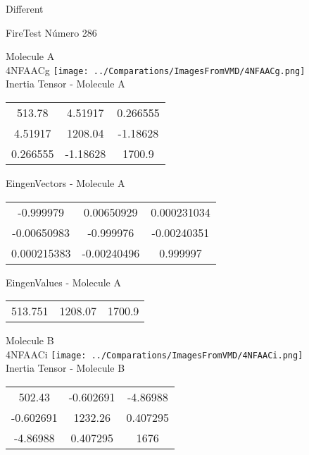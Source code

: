 \begin{center}
\vtab
\vtab
\textcolor{NavyBlue}{\Large Different}
\end{center}

 \newpage

\vtab[-2cm]
\begin{center}
{\large FireTest \tab Número 286}
\end{center}
\begin{multicols}{2}
\begin{center}

Molecule A \\ 
4NFAACg
\texttt{[image: ../Comparations/ImagesFromVMD/4NFAACg.png]}
\\
Inertia Tensor - Molecule A \\
\vtab

\begin{tabular}{|c c c|}
513.78	 & 	4.51917	 & 	0.266555	 \\
4.51917	 & 	1208.04	 & 	-1.18628	 \\
0.266555	 & 	-1.18628	 & 	1700.9
\end{tabular}

\vtab
 EingenVectors - Molecule A     \\
\vtab
\begin{tabular}{|c c c|}
-0.999979	 & 	0.00650929	 & 	0.000231034	 \\
-0.00650983	 & 	-0.999976	 & 	-0.00240351	 \\
0.000215383	 & 	-0.00240496	 & 	0.999997
\end{tabular}

\vtab
 EingenValues - Molecule A     \\
\vtab
\begin{tabular}{|c c c|}
513.751	 & 	1208.07	 & 	1700.9	 \\
\end{tabular}
\columnbreak

Molecule B \\ 
4NFAACi
\texttt{[image: ../Comparations/ImagesFromVMD/4NFAACi.png]}
\\
Inertia Tensor - Molecule B \\
\vtab

\begin{tabular}{|c c c|}
502.43	 & 	-0.602691	 & 	-4.86988	 \\
-0.602691	 & 	1232.26	 & 	0.407295	 \\
-4.86988	 & 	0.407295	 & 	1676
\end{tabular}


\end{center}
\end{multicols}
